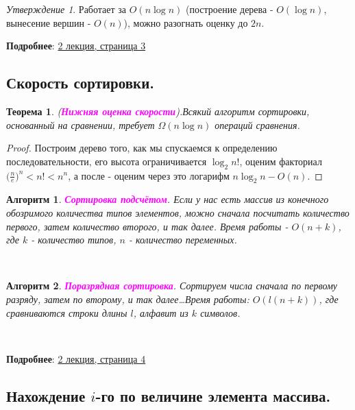 \documentclass[a4paper]{article}
\theoremstyle{indented}
\newtheorem{theorem}{Теорема}
\newtheorem{alg}{Алгоритм}
\theoremstyle{definition}
\theoremstyle{remark}
\newtheorem{stat}{Утверждение}
\begin{document}
\begin{stat}
    Работает за $O(n\log n)$ (построение дерева - $O(\log n)$, вынесение вершин - $O(n)$), можно разогнать оценку до $2n$. 
\end{stat}

\textbf{Подробнее}: \href{https://users.math-cs.spbu.ru/~okhotin/teaching/algorithms_2020/okhotin_algorithms_2020_l2.pdf}{2 лекция, страница 3}

\subsection{Скорость сортировки.} 
 
\begin{theorem}
    (\textcolor{magenta}{\hypertarget{t2.5}{\textbf{Нижняя оценка скорости}}}).Всякий алгоритм сортировки, основанный на сравнении, требует $\Omega (n\log n)$ операций сравнения.
\end{theorem}

\begin{proof}
    Построим дерево того, как мы спускаемся к определению последовательности, его высота ограничивается $\log_2n!$, оценим факториал $\biggl(\frac{n}{e}\biggr)^n<n!<n^n$, а после - оценим через это логарифм $n\log_2n - O(n)$. 
\end{proof}

\begin{alg}
    \textcolor{magenta}{\hypertarget{t3}{\textbf{Сортировка подсчётом}}}. Если у нас есть массив из конечного обозримого количества типов элементов, можно сначала посчитать количество первого, затем количество второго, и так далее. Время работы - $O(n+k)$, где $k$ - количество типов, $n$ - количество переменных.
\end{alg} \ 

\begin{alg}
    \textcolor{magenta}{\hypertarget{t4}{\textbf{Поразрядная сортировка}}}. Сортируем числа сначала по первому разряду, затем по второму, и так далее\dots Время работы: $O(l(n+k))$, где сравниваются строки длины $l$, алфавит из $k$ символов.
\end{alg}  \ 

\textbf{Подробнее}: \href{https://users.math-cs.spbu.ru/~okhotin/teaching/algorithms_2020/okhotin_algorithms_2020_l2.pdf}{2 лекция, страница 4}

\subsection{Нахождение $i$-го по величине элемента массива.} 
\end{document}

